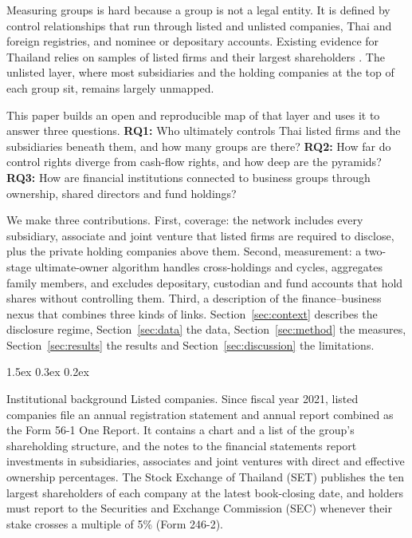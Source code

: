 \documentclass[11pt]{article}
\makeatletter
\renewcommand\section{\@startsection{section}{1}{\z@}{-2.0ex \@plus -0.5ex \@minus -0.2ex}%
  {1.5ex \@plus 0.3ex \@minus 0.2ex}{\large\bfseries\raggedright}}
\renewcommand\paragraph{\@startsection{paragraph}{4}{\z@}{1.5ex \@plus 0.5ex \@minus 0.2ex}{-1em}%
  {\normalsize\bfseries}}
\makeatother
\begin{document}
Measuring groups is hard because a group is not a legal entity. It is defined by control relationships that run
through listed and unlisted companies, Thai and foreign registries, and nominee or depositary accounts. Existing
evidence for Thailand relies on samples of listed firms and their largest shareholders
\citep{claessens2000,wiwattanakantang2001}. The unlisted layer, where most subsidiaries and the holding companies at
the top of each group sit, remains largely unmapped.

This paper builds an open and reproducible map of that layer and uses it to answer three questions.
\textbf{RQ1:} Who ultimately controls Thai listed firms and the subsidiaries beneath them, and how many groups are
there? \textbf{RQ2:} How far do control rights diverge from cash-flow rights, and how deep are the pyramids?
\textbf{RQ3:} How are financial institutions connected to business groups through ownership, shared directors and
fund holdings?

We make three contributions. First, coverage: the network includes every subsidiary, associate and joint venture
that listed firms are required to disclose, plus the private holding companies above them. Second, measurement: a
two-stage ultimate-owner algorithm handles cross-holdings and cycles, aggregates family members, and excludes
depositary, custodian and fund accounts that hold shares without controlling them. Third, a description of the
finance--business nexus that combines three kinds of links. Section~\ref{sec:context} describes the disclosure
regime, Section~\ref{sec:data} the data, Section~\ref{sec:method} the measures, Section~\ref{sec:results} the
results and Section~\ref{sec:discussion} the limitations.

\section{Institutional background}\label{sec:context}
\paragraph{Listed companies.} Since fiscal year 2021, listed companies file an annual registration statement and
annual report combined as the Form 56-1 One Report. It contains a chart and a list of the group's shareholding
structure, and the notes to the financial statements report investments in subsidiaries, associates and joint
ventures with direct and effective ownership percentages. The Stock Exchange of Thailand (SET) publishes the ten
largest shareholders of each company at the latest book-closing date, and holders must report to the Securities and
Exchange Commission (SEC) whenever their stake crosses a multiple of 5\% (Form 246-2).
\end{document}
